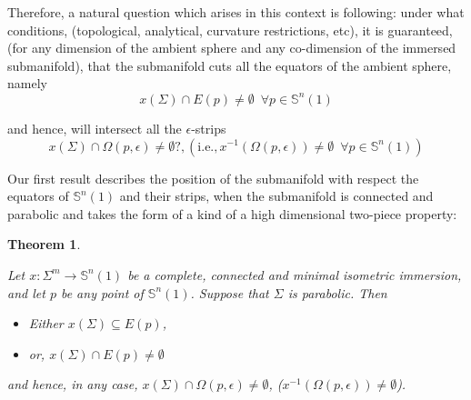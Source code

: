 \documentclass{amsart}
\newtheorem{theorem}{Theorem}[section]
\theoremstyle{definition}
\theoremstyle{remark}
\begin{document}
  Therefore,  a natural question which arises in this context is following: under what conditions, (topological, analytical, curvature restrictions, etc), it is guaranteed, (for any dimension of the ambient sphere and any co-dimension of the immersed submanifold), that the submanifold cuts all the equators of the ambient sphere, namely
        $$x(\Sigma) \cap E(p) \neq \emptyset\,\,\,\forall p \in \mathbb{S}^n(1)$$
        
        \noindent and hence, will intersect all the $\epsilon$-strips
        $$x(\Sigma) \cap \Omega(p,\epsilon) \neq \emptyset?, (\text{i.e.}, x^{-1}(\Omega(p,\epsilon))\neq \emptyset\,\,\,\forall p \in \mathbb{S}^n(1))$$
   
    Our first result describes  the position of the submanifold with respect the equators of $\mathbb{S}^n(1)$ and their strips, when the submanifold is connected and parabolic and takes the form of a kind of a high dimensional two-piece property:
 
\begin{theorem}\label{twopiecegeneral}

Let $x:\Sigma^m \to \mathbb{S}^n(1)$ be a complete, connected and minimal isometric immersion, and let $p$ be any point of $\mathbb{S}^n(1)$. Suppose that $\Sigma$ is parabolic. Then
    \begin{itemize}
        \item Either $x(\Sigma)\subseteq E(p)$, 
        \item or, $x(\Sigma)\cap E(p)\neq \emptyset$
            \end{itemize}
            and  hence, in any case,  $x(\Sigma) \cap \Omega(p,\epsilon) \neq \emptyset$, ($x^{-1}(\Omega(p,\epsilon))\neq \emptyset$).
\end{theorem}
\end{document}
